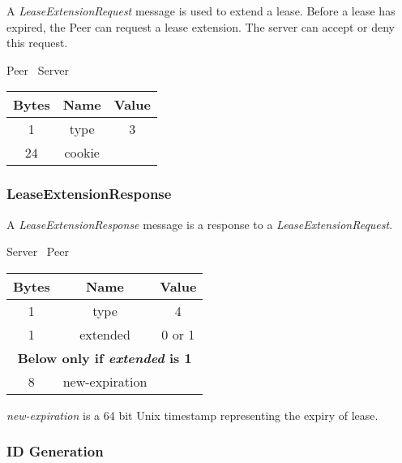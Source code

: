 \documentclass{article}
\begin{document}
    A \emph{LeaseExtensionRequest} message is used to extend a lease. Before a lease has expired, the Peer can
    request a lease extension. The server can accept or deny this request.

    \begin{center}
        Peer \textrightarrow\ Server\\
        \begin{tabular}{|c|c|c|}
            \hline
            \textbf{Bytes} & \textbf{Name} & \textbf{Value} \\
            \hline
            1              & type          & 3              \\
            \hline
            24             & cookie        &                \\
            \hline
        \end{tabular}
    \end{center}

    \subsubsection{LeaseExtensionResponse}

    A \emph{LeaseExtensionResponse} message is a response to a \emph{LeaseExtensionRequest}.

    \begin{center}
        Server \textrightarrow\ Peer\\
        \begin{tabular}{|c|c|c|}
            \hline
            \textbf{Bytes} & \textbf{Name}  & \textbf{Value} \\
            \hline
            1              & type           & 4              \\
            \hline
            1              & extended       & 0 or 1         \\
            \hline
            \multicolumn{3}{|c|}{\textbf{Below only if \emph{extended} is 1} } \\
            \hline
            8              & new-expiration &                \\
            \hline
        \end{tabular}
    \end{center}

    \emph{new-expiration} is a 64 bit Unix timestamp representing the expiry of lease.

    \subsubsection{ID Generation}
\end{document}
